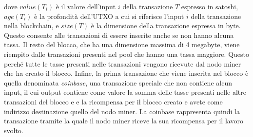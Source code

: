 dove $value(T_i)$ è il valore dell'input $i$ della transazione $T$ espresso in satoshi, $age(T_i)$ è la profondità dell'UTXO a cui si riferisce l'input $i$ della transazione nella blockchain, e $size(T)$ è la dimensione della transazione espressa in byte.
Questo consente alle transazioni di essere inserite anche se non hanno alcuna tassa.
Il resto del blocco, che ha una dimensione massima di 4 megabyte, viene riempito dalle transazioni presenti nel pool che hanno una tassa maggiore. Questo perché tutte le tasse presenti nelle transazioni vengono ricevute dal nodo miner che ha creato il blocco.
Infine, la prima transazione che viene inserita nel blocco è quella denominata \emph{coinbase}, una transazione speciale che non contiene alcun input, il cui output contiene come valore la somma delle tasse presenti nelle altre transazioni del blocco e e la ricompensa per il blocco creato e avete come indirizzo destinazione quello del nodo miner. La coinbase rappresenta quindi la transazione tramite la quale il nodo miner riceve la sua ricompensa per il lavoro svolto.

